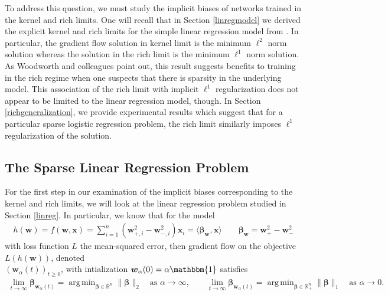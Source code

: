 \documentclass{article}
\DeclareMathOperator*{\argmin}{arg\,min}
\begin{document}
To address this question, we must study the implicit biases of networks trained in the kernel and rich limits. One will recall that in Section \ref{linregmodel} we derived the explicit kernel and rich limits for the simple linear regression model from \cite{woodworth2020kernel}. In particular, the gradient flow solution in kernel limit is the minimum $\ell^2$ norm solution whereas the solution in the rich limit is the minimum $\ell^1$ norm solution. As Woodworth and colleagues point out, this result suggests benefits to training in the rich regime when one suspects that there is sparsity in the underlying model. This association of the rich limit with implicit $\ell^1$ regularization does not appear to be limited to the linear regression model, though. In Section \ref{richgeneralization}, we provide experimental results which suggest that for a particular sparse logistic regression problem, the rich limit similarly imposes $\ell^1$ regularization of the solution.

\subsection{The Sparse Linear Regression Problem}

For the first step in our examination of the implicit biases corresponding to the kernel and rich limits, we will look at the linear regression problem studied in Section \ref{linreg}. In particular, we know that for the model
\begin{align*}
    h(\boldsymbol{w}) = f(\boldsymbol{w}, \boldsymbol{x}) = \sum_{i=1}^n(\boldsymbol{w}_{+, i}^2 - \boldsymbol{w}_{-, i}^2)\boldsymbol{x}_i = \langle \boldsymbol{\beta}_{\boldsymbol{w}}, \boldsymbol{x} \rangle \qquad \boldsymbol{\beta}_{\boldsymbol{w}} = \boldsymbol{w}_+^2 -\boldsymbol{w}_-^2
\end{align*}
with loss function $L$ the mean-squared error, then gradient flow on the objective $L(h(\boldsymbol{w}))$, denoted\\ $(\boldsymbol{w}_{\alpha}(t))_{t \geq 0}$, with intialization $\boldsymbol{w}_{\alpha}(0) = \alpha \mathbbm{1}$ satisfies
\begin{align*}
    \lim_{t \to \infty} \boldsymbol{\beta}_{\boldsymbol{w}_{\alpha}(t)} = \argmin_{\boldsymbol{\beta} \in \mathbb{R}^n}  \| \boldsymbol{\beta} \|_2 \quad \text{as $\alpha \longrightarrow \infty$}, \qquad 
    \lim_{t \to \infty} \boldsymbol{\beta}_{\boldsymbol{w}_{\alpha}(t)} = \argmin_{\boldsymbol{\beta} \in \mathbb{R}_+^n}  \| \boldsymbol{\beta} \|_1 \quad \text{as $\alpha \longrightarrow 0$}.
\end{align*}
\end{document}
